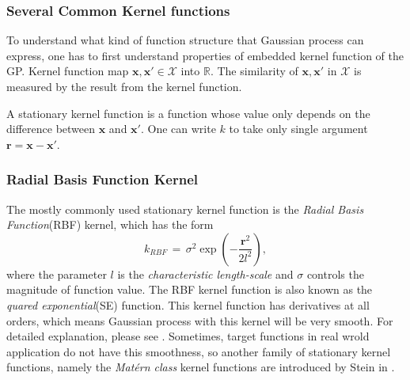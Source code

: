 \documentclass[11pt,a4paper]{article}
\theoremstyle{definition}
\newcommand{\RR}{\mathbb{R}}
\numberwithin{equation}{section}
\let\vec\mathbf
\begin{document}
	\subsubsection{Several Common Kernel functions}
	To understand what kind of function structure that Gaussian process can express, one has to first understand properties of embedded kernel function of the GP.
	Kernel function map $\vec x,\vec x' \in \mathcal X$ into $\RR$. The similarity of $\vec x,\vec x'$ in $\mathcal X$ is measured by the result from the kernel function.
	
	A stationary kernel function is a function whose value only depends on the difference between $\vec x$ and $\vec x'$. One can write $k$ to take only single argument $\vec r = \vec x - \vec x'$. 
	\subsubsection*{Radial Basis Function Kernel}
	The mostly commonly used stationary kernel function is the \textit{Radial Basis Function}(RBF) kernel, which has the form
	\begin{equation}\label{RBF}
	k_{RBF}\, = \, \sigma^2\exp\left(-\frac{\vec r^2}{2l^2}\right),
	\end{equation}
	where the parameter $l$ is the \textit{characteristic length-scale} and $\sigma$ controls the magnitude of function value. The RBF kernel function is also known as the \textit{quared exponential}(SE) function. This kernel function has derivatives at all orders, which means Gaussian process with this kernel will be very smooth. For detailed explanation, please see \cite[sec 4.2]{RandW}. Sometimes, target functions in real wrold application do not have this smoothness, so another family of stationary kernel functions, namely the \textit{Mat\'ern class} kernel functions are introduced by Stein in \cite{Stein}.
	
\end{document}
